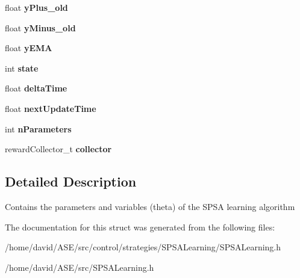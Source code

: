 \begin{CompactItemize}
\item 
\hypertarget{structSPSALearning__t_a3237274084059b17615f5dbdee7c580}{
float \textbf{yPlus\_\-old}}
\label{structSPSALearning__t_a3237274084059b17615f5dbdee7c580}

\item 
\hypertarget{structSPSALearning__t_ffbb0b145a9feca43ab4e20f7201acd0}{
float \textbf{yMinus\_\-old}}
\label{structSPSALearning__t_ffbb0b145a9feca43ab4e20f7201acd0}

\item 
\hypertarget{structSPSALearning__t_f0dd32d5c5b53114fabda1e3fc6fc67e}{
float \textbf{yEMA}}
\label{structSPSALearning__t_f0dd32d5c5b53114fabda1e3fc6fc67e}

\item 
\hypertarget{structSPSALearning__t_217b05bcb058420445d7a4e0b2e14607}{
int \textbf{state}}
\label{structSPSALearning__t_217b05bcb058420445d7a4e0b2e14607}

\item 
\hypertarget{structSPSALearning__t_7bea8974895362b124efa98ab63d26cf}{
float \textbf{deltaTime}}
\label{structSPSALearning__t_7bea8974895362b124efa98ab63d26cf}

\item 
\hypertarget{structSPSALearning__t_b7a9a2856d65901afd1639300bc538f9}{
float \textbf{nextUpdateTime}}
\label{structSPSALearning__t_b7a9a2856d65901afd1639300bc538f9}

\item 
\hypertarget{structSPSALearning__t_2c39b7b8eeff842bd1649b3bd0554f9a}{
int \textbf{nParameters}}
\label{structSPSALearning__t_2c39b7b8eeff842bd1649b3bd0554f9a}

\item 
\hypertarget{structSPSALearning__t_2f6715d70698c2a2cba4cc61c5082a50}{
rewardCollector\_\-t \textbf{collector}}
\label{structSPSALearning__t_2f6715d70698c2a2cba4cc61c5082a50}

\end{CompactItemize}


\subsection{Detailed Description}
Contains the parameters and variables (theta) of the SPSA learning algorithm 

The documentation for this struct was generated from the following files:\begin{CompactItemize}
\item 
/home/david/ASE/src/control/strategies/SPSALearning/SPSALearning.h\item 
/home/david/ASE/src/SPSALearning.h\end{CompactItemize}
